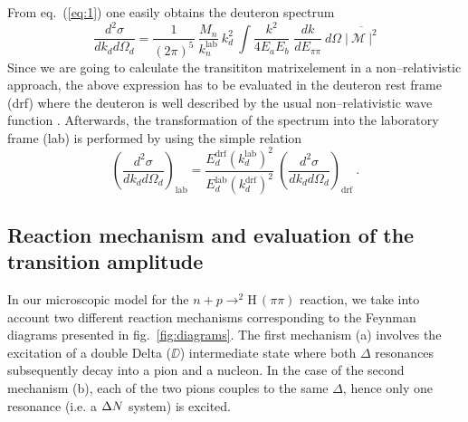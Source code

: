 From eq.\ (\ref{eq:1}) one easily obtains the deuteron spectrum
%
\begin{equation}
  \label{eq:2}
  \frac{d^2 \sigma}{dk_d d\Omega_d} = \frac{1}{(2 \pi)^5} \: \frac{M_n}{k_n^{\text{lab}}}
  \: k_d^2 \: \int \frac{k^2}{4 E_a E_b} \; \frac{dk}{d E_{\pi\pi}} \: d\Omega \; 
  \overline{\bigl| \: {\mathcal M} \: \bigr| ^{2}}
\end{equation}
%
Since we are going to calculate the transititon matrixelement in a 
non--relativistic approach, the above expression has to be evaluated
in the deuteron rest frame (drf) where the deuteron is well described by 
the usual non--relativistic wave function \cite{machleidt87}. 
Afterwards, the transformation 
of the spectrum into the laboratory frame (lab) is performed by using the
simple relation
%
\begin{equation}
  \label{eq:3}
  \left( \frac{d^2 \sigma}{dk_d d\Omega_d} \right)_{\text{lab}}
  = \frac{E_d^{\text{drf}} (k_d^{\text{lab}})^2}{E_d^{\text{lab}} 
  (k_d^{\text{drf}})^2}
  \: \left( \frac{d^2 \sigma}{dk_d d\Omega_d} \right)_{\text{drf}} \:.
\end{equation}


\subsection{Reaction mechanism and evaluation of the transition amplitude} 

In our microscopic model for the $n+p \to ^2$H$\, (\pi\pi)$ reaction, 
we take into account
two different reaction mechanisms corresponding to the Feynman diagrams 
presented in fig.\ \ref{fig:diagrams}. The first mechanism (a) involves the 
excitation of a double Delta ($\DD$) intermediate state where both $\Delta$
resonances subsequently decay into a pion and a nucleon.
In the case of the second mechanism (b), each of the two pions couples to
the same $\Delta$, hence only one resonance (i.e. a ${\Delta N}$ system) is excited.

